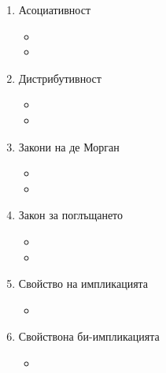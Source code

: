 \begin{enumerate}
    \item Асоциативност
        \begin{itemize}
            \item {}
            \item {}
        \end{itemize}
    \item Дистрибутивност
        \begin{itemize}
            \item {}
            \item {}
        \end{itemize}
    \item Закони на де Морган
        \begin{itemize}
            \item {}
            \item {}
        \end{itemize}
    \item Закон за поглъщането
        \begin{itemize}
            \item {}
            \item {}
        \end{itemize}
    \item Свойство на импликацията
        \begin{itemize}
            \item {}
        \end{itemize}
    \item Свойствона би-импликацията
        \begin{itemize}
            \item {}
        \end{itemize}
\end{enumerate}

